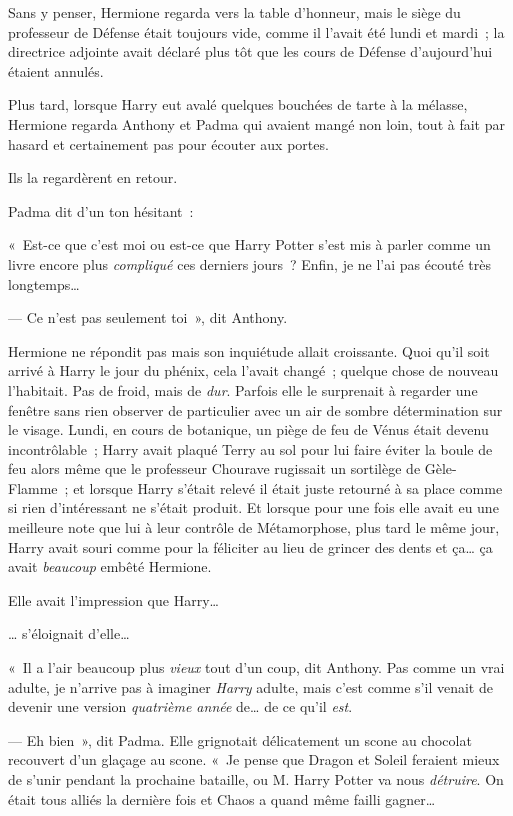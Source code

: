 Sans y penser, Hermione regarda vers la table d'honneur, mais le siège du professeur de Défense était toujours vide, comme il l'avait été lundi et mardi~; la directrice adjointe avait déclaré plus tôt que les cours de Défense d'aujourd'hui étaient annulés.

Plus tard, lorsque Harry eut avalé quelques bouchées de tarte à la mélasse, Hermione regarda Anthony et Padma qui avaient mangé non loin, tout à fait par hasard et certainement pas pour écouter aux portes.

Ils la regardèrent en retour.

Padma dit d'un ton hésitant~:

«~Est-ce que c'est moi ou est-ce que Harry Potter s'est mis à parler comme un livre encore plus \emph{compliqué} ces derniers jours~? Enfin, je ne l'ai pas écouté très longtemps…

--- Ce n'est pas seulement toi~», dit Anthony.

Hermione ne répondit pas mais son inquiétude allait croissante. Quoi qu'il soit arrivé à Harry le jour du phénix, cela l'avait changé~; quelque chose de nouveau l'habitait. Pas de froid, mais de \emph{dur}. Parfois elle le surprenait à regarder une fenêtre sans rien observer de particulier avec un air de sombre détermination sur le visage. Lundi, en cours de botanique, un piège de feu de Vénus était devenu incontrôlable~; Harry avait plaqué Terry au sol pour lui faire éviter la boule de feu alors même que le professeur Chourave rugissait un sortilège de Gèle-Flamme~; et lorsque Harry s'était relevé il était juste retourné à sa place comme si rien d'intéressant ne s'était produit. Et lorsque pour une fois elle avait eu une meilleure note que lui à leur contrôle de Métamorphose, plus tard le même jour, Harry avait souri comme pour la féliciter au lieu de grincer des dents et ça… ça avait \emph{beaucoup} embêté Hermione.

Elle avait l'impression que Harry…

… s'éloignait d'elle…

«~Il a l'air beaucoup plus \emph{vieux} tout d'un coup, dit Anthony. Pas comme un vrai adulte, je n'arrive pas à imaginer \emph{Harry} adulte, mais c'est comme s'il venait de devenir une version \emph{quatrième année} de… de ce qu'il \emph{est}.

--- Eh bien~», dit Padma. Elle grignotait délicatement un scone au chocolat recouvert d'un glaçage au scone. «~Je pense que Dragon et Soleil feraient mieux de s'unir pendant la prochaine bataille, ou M. Harry Potter va nous \emph{détruire}. On était tous alliés la dernière fois et Chaos a quand même failli gagner…

